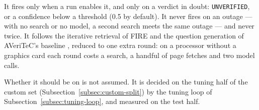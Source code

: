 It fires only when a run enables it, and only on a verdict in doubt:
\texttt{UNVERIFIED}, or a confidence below a threshold (0.5 by default).
It never fires on an outage --- with no search or no model, a second
search meets the same outage --- and never twice. It follows the
iterative retrieval of FIRE \cite{xie2025fire} and the question
generation of AVeriTeC's baseline \cite{schlichtkrull2023averitec},
reduced to one extra round: on a processor without a graphics card each
round costs a search, a handful of page fetches and two model calls.

Whether it should be on is not assumed. It is decided on the tuning
half of the custom set (Subsection~\ref{subsec:custom-split}) by the
tuning loop of Subsection~\ref{subsec:tuning-loop}, and measured on the
test half.
